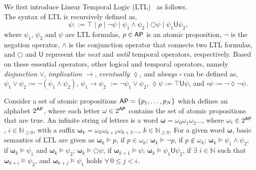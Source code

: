 \documentclass[letterpaper, 10 pt, conference]{ieeeconf}
\begin{document}
We first introduce Linear Temporal Logic (LTL)~\cite{modelchecking2008, calin2017book} as follows. \\
 The syntax of LTL is recursively defined as,
\begin{equation}
    \psi ::= \top \mid p \mid \neg \psi \mid \psi_1 \wedge \psi_2 \mid \bigcirc \psi \mid \psi_1 \mathsf{U} \psi_2,
\end{equation}
where  $\psi_1$, $\psi_2$ and $\psi$ are LTL formulas, $p \in \mathsf{AP}$ is an atomic proposition, $\neg$ is the negation operator, $\wedge$ is the conjunction operator that connects two LTL formulas, and $\bigcirc$ and $\mathsf{U}$ represent the \textit{next} and \textit{until} temporal operators, respectively. Based on these essential operators, other logical and temporal operators, namely \textit{disjunction} $\vee$, \textit{implication} $\rightarrow$, \textit{eventually} $\lozenge$, and \textit{always} $\square$ can be defined as, $\psi_1 \vee \psi_2:= \lnot \!\left(\psi_1 \wedge \psi_2 \right)$, $\psi_1 \rightarrow \psi_2$ $:= \lnot \psi_1 \vee \psi_2$, $\lozenge \psi :=\top \mathsf{U} \psi$, and $\square \psi :=\neg \lozenge \neg \psi$.
\smallskip

 Consider a set of atomic propositions $\mathsf{AP} = \left\{ p_1, \dots, p_N \right\}$ which defines an alphabet $2^{\mathsf{AP}}$, where each letter $\omega \in 2^{\mathsf{AP}}$ contains the set of atomic propositions that are true. An infinite string of letters is a word $\pmb{\omega} = \omega_0 \omega_{1} \omega_{2} \dots$, where $\omega_i \in 2^{\mathsf{AP}}$, $i \in \mathbb{N}_{\geq 0}$, with a suffix $\pmb{\omega}_k = \omega_k \omega_{k+1} \omega_{k+2} \dots$, $k \in \mathbb{N}_{\geq 0}$. For a given word $\pmb{\omega}$, basic semantics of LTL are given as
$\pmb\omega_k \models p$, if $p \in \omega_k$; $\pmb\omega_k \models \lnot p$, if $p \notin \omega_k$;
$\pmb\omega_k \models \psi_1 \wedge \psi_2$, if $\pmb \omega_k \models \psi_1$ and $\pmb \omega_k \models \psi_2$;
$\pmb\omega_k \models \bigcirc \psi$, if $\pmb\omega_{k+1} \models \psi$;
$\pmb\omega_k \models \psi_1 \mathsf{U} \psi_2$, if $\exists$ $i \in \mathbb{N}$ such that $\pmb\omega_{k+i} \models \psi_2$, and $\pmb\omega_{k+j} \models \psi_1$ holds $\forall \, 0\leq j < i$.
\smallskip
\end{document}
